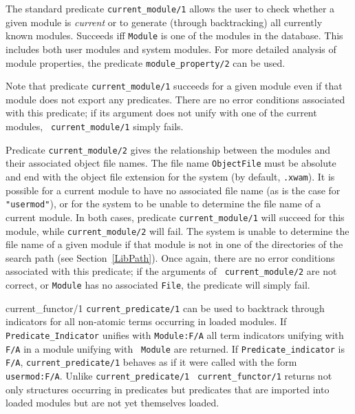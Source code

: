 \begin{description}
    The standard predicate {\tt current\_module/1} allows the user to
    check whether a given module is {\em current} or to generate
    (through backtracking) all currently known modules.  Succeeds iff
    {\tt Module} is one of the modules in the database. This includes
    both user modules and system modules.  For more detailed analysis
    of module properties, the predicate {\tt module\_property/2}
    can be used.

    Note that predicate {\tt current\_module/1} succeeds for a given
    module even if that module does not export any predicates. There
    are no error conditions associated with this predicate; if its
    argument does not unify with one of the current modules, {\tt
    current\_module/1} simply fails.

    Predicate {\tt current\_module/2} gives the relationship between
    the modules and their associated object file names. The file name
    {\tt ObjectFile} must be absolute and end with the object file
    extension for the system (by default, {\tt .xwam}).
%
    It is possible for a current module to have no associated file
    name (as is the case for {\tt "usermod"}), or for the system to be
    unable to determine the file name of a current module. In both
    cases, predicate {\tt current\_module/1} will succeed for this
    module, while {\tt current\_module/2} will fail. The system is
    unable to determine the file name of a given module if that module
    is not in one of the directories of the search path (see
    Section~\ref{LibPath}).  Once again, there are no error conditions
    associated with this predicate; if the arguments of {\tt
    current\_module/2} are not correct, or {\tt Module} has no
    associated {\tt File}, the predicate will simply fail.

{current\_functor/1}
{\tt current\_predicate/1} can be used to backtrack through indicators
for all non-atomic terms occurring in loaded modules.  If {\tt
Predicate\_Indicator} unifies with {\tt Module:F/A} all term
indicators unifying with {\tt F/A} in a module unifying with {\tt
Module} are returned.  If {\tt Predicate\_indicator} is {\tt F/A},
{\tt current\_predicate/1} behaves as if it were called with the form
{\tt usermod:F/A}.  Unlike {\tt current\_predicate/1} {\tt
current\_functor/1} returns not only structures occurring in
predicates but predicates that are imported into loaded modules but
are not yet themselves loaded.


\end{description}
